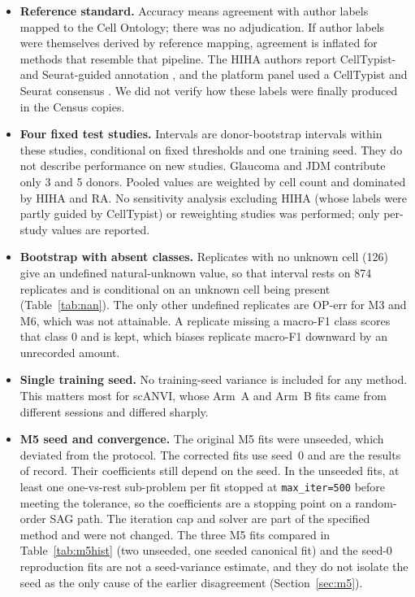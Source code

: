 \documentclass[11pt]{article}
\newcommand{\code}[1]{\texttt{#1}}
\begin{document}
\begin{itemize}
\item \textbf{Reference standard.} Accuracy means agreement with author labels mapped to the Cell Ontology; there was no adjudication. If author labels were themselves derived by reference mapping, agreement is inflated for methods that resemble that pipeline. The HIHA authors report CellTypist- and Seurat-guided annotation \citep{gong2025hiha}, and the platform panel used a CellTypist and Seurat consensus \citep{desimone2025platforms}. We did not verify how these labels were finally produced in the Census copies.
\item \textbf{Four fixed test studies.} Intervals are donor-bootstrap intervals within these studies, conditional on fixed thresholds and one training seed. They do not describe performance on new studies. Glaucoma and JDM contribute only 3 and 5 donors. Pooled values are weighted by cell count and dominated by HIHA and RA. No sensitivity analysis excluding HIHA (whose labels were partly guided by CellTypist) or reweighting studies was performed; only per-study values are reported.
\item \textbf{Bootstrap with absent classes.} Replicates with no unknown cell (126) give an undefined natural-unknown value, so that interval rests on 874 replicates and is conditional on an unknown cell being present (Table~\ref{tab:nan}). The only other undefined replicates are OP-err for M3 and M6, which was not attainable. A replicate missing a macro-F1 class scores that class 0 and is kept, which biases replicate macro-F1 downward by an unrecorded amount.
\item \textbf{Single training seed.} No training-seed variance is included for any method. This matters most for scANVI, whose Arm~A and Arm~B fits came from different sessions and differed sharply.
\item \textbf{M5 seed and convergence.} The original M5 fits were unseeded, which deviated from the protocol. The corrected fits use seed~0 and are the results of record. Their coefficients still depend on the seed. In the unseeded fits, at least one one-vs-rest sub-problem per fit stopped at \code{max\_iter=500} before meeting the tolerance, so the coefficients are a stopping point on a random-order SAG path. The iteration cap and solver are part of the specified method and were not changed. The three M5 fits compared in Table~\ref{tab:m5hist} (two unseeded, one seeded canonical fit) and the seed-0 reproduction fits are not a seed-variance estimate, and they do not isolate the seed as the only cause of the earlier disagreement (Section~\ref{sec:m5}).

\end{itemize}
\end{document}
